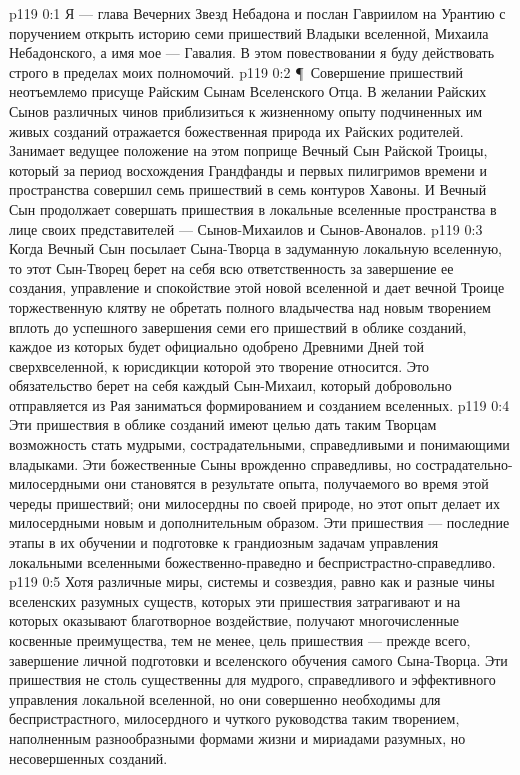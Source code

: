\author{Глава Вечерних Звезд}
\vs p119 0:1 Я --- глава Вечерних Звезд Небадона и послан Гавриилом на Урантию с поручением открыть историю семи пришествий Владыки вселенной, Михаила Небадонского, а имя мое --- Гавалия. В этом повествовании я буду действовать строго в пределах моих полномочий.
\vs p119 0:2 \P\ Совершение пришествий неотъемлемо присуще Райским Сынам Вселенского Отца. В желании Райских Сынов различных чинов приблизиться к жизненному опыту подчиненных им живых созданий отражается божественная природа их Райских родителей. Занимает ведущее положение на этом поприще Вечный Сын Райской Троицы, который за период восхождения Грандфанды и первых пилигримов времени и пространства совершил семь пришествий в семь контуров Хавоны. И Вечный Сын продолжает совершать пришествия в локальные вселенные пространства в лице своих представителей --- Сынов\hyp{}Михаилов и Сынов\hyp{}Авоналов.
\vs p119 0:3 Когда Вечный Сын посылает Сына\hyp{}Творца в задуманную локальную вселенную, то этот Сын\hyp{}Творец берет на себя всю ответственность за завершение ее создания, управление и спокойствие этой новой вселенной и дает вечной Троице торжественную клятву не обретать полного владычества над новым творением вплоть до успешного завершения семи его пришествий в облике созданий, каждое из которых будет официально одобрено Древними Дней той сверхвселенной, к юрисдикции которой это творение относится. Это обязательство берет на себя каждый Сын\hyp{}Михаил, который добровольно отправляется из Рая заниматься формированием и созданием вселенных.
\vs p119 0:4 Эти пришествия в облике созданий имеют целью дать таким Творцам возможность стать мудрыми, сострадательными, справедливыми и понимающими владыками. Эти божественные Сыны врожденно справедливы, но сострадательно\hyp{}милосердными они становятся в результате опыта, получаемого во время этой череды пришествий; они милосердны по своей природе, но этот опыт делает их милосердными новым и дополнительным образом. Эти пришествия --- последние этапы в их обучении и подготовке к грандиозным задачам управления локальными вселенными божественно\hyp{}праведно и беспристрастно\hyp{}справедливо.
\vs p119 0:5 Хотя различные миры, системы и созвездия, равно как и разные чины вселенских разумных существ, которых эти пришествия затрагивают и на которых оказывают благотворное воздействие, получают многочисленные косвенные преимущества, тем не менее, цель пришествия --- прежде всего, завершение личной подготовки и вселенского обучения самого Сына\hyp{}Творца. Эти пришествия не столь существенны для мудрого, справедливого и эффективного управления локальной вселенной, но они совершенно необходимы для беспристрастного, милосердного и чуткого руководства таким творением, наполненным разнообразными формами жизни и мириадами разумных, но несовершенных созданий.
